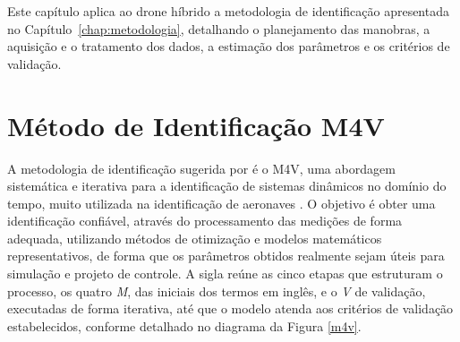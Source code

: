 {\color{blue}Este capítulo aplica ao drone híbrido a metodologia de identificação apresentada no Capítulo~\ref{chap:metodologia}, detalhando o planejamento das manobras, a aquisição e o tratamento dos dados, a estimação dos parâmetros e os critérios de validação.}

\section{Método de Identificação M4V}

A metodologia de identificação sugerida por \textcite{Jategaonkar2015} é o M4V, uma abordagem sistemática e iterativa para a identificação de sistemas dinâmicos no domínio do tempo, muito utilizada na identificação de aeronaves \cite{Jategaonkar2015, Tischler2012}. O objetivo é obter uma identificação confiável, através do processamento das medições de forma adequada, utilizando métodos de otimização e modelos matemáticos representativos, de forma que os parâmetros obtidos realmente sejam úteis para simulação e projeto de controle.  A sigla reúne as cinco etapas que estruturam o processo, os quatro \textit{M}, das iniciais dos termos em inglês, e o \textit{V} de validação, executadas de forma iterativa, até que o modelo atenda aos critérios de validação estabelecidos, conforme detalhado no diagrama da Figura \ref{m4v}. 

